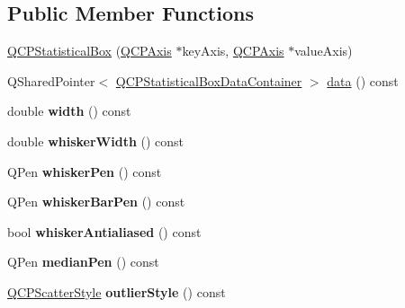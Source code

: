 \subsection*{Public Member Functions}
\begin{DoxyCompactItemize}
\item 
\hyperlink{classQCPStatisticalBox_a75c2b3e7fcd0741cc981693a2ba63b27}{Q\+C\+P\+Statistical\+Box} (\hyperlink{classQCPAxis}{Q\+C\+P\+Axis} $\ast$key\+Axis, \hyperlink{classQCPAxis}{Q\+C\+P\+Axis} $\ast$value\+Axis)
\item 
Q\+Shared\+Pointer$<$ \hyperlink{classQCPDataContainer}{Q\+C\+P\+Statistical\+Box\+Data\+Container} $>$ \hyperlink{classQCPStatisticalBox_a99de828ddad81bb79aaed7db54b87e3f}{data} () const 
\item 
double {\bfseries width} () const \hypertarget{classQCPStatisticalBox_a0733a7bd575fc5929ce6d507bcc2a04c}{}\label{classQCPStatisticalBox_a0733a7bd575fc5929ce6d507bcc2a04c}

\item 
double {\bfseries whisker\+Width} () const \hypertarget{classQCPStatisticalBox_ab02392dd54ebd6dd7c8d6fb5c3f0421c}{}\label{classQCPStatisticalBox_ab02392dd54ebd6dd7c8d6fb5c3f0421c}

\item 
Q\+Pen {\bfseries whisker\+Pen} () const \hypertarget{classQCPStatisticalBox_a26d2b34cbaeac2dd639bb21590f317c4}{}\label{classQCPStatisticalBox_a26d2b34cbaeac2dd639bb21590f317c4}

\item 
Q\+Pen {\bfseries whisker\+Bar\+Pen} () const \hypertarget{classQCPStatisticalBox_ab151a727fb0b6396acb3b6c72505a4fe}{}\label{classQCPStatisticalBox_ab151a727fb0b6396acb3b6c72505a4fe}

\item 
bool {\bfseries whisker\+Antialiased} () const \hypertarget{classQCPStatisticalBox_a1385fb66ed6a1e8edd9128eb7dca73d6}{}\label{classQCPStatisticalBox_a1385fb66ed6a1e8edd9128eb7dca73d6}

\item 
Q\+Pen {\bfseries median\+Pen} () const \hypertarget{classQCPStatisticalBox_a96aa0bb650b83e9dfa0387ca4db7fa05}{}\label{classQCPStatisticalBox_a96aa0bb650b83e9dfa0387ca4db7fa05}

\item 
\hyperlink{classQCPScatterStyle}{Q\+C\+P\+Scatter\+Style} {\bfseries outlier\+Style} () const \hypertarget{classQCPStatisticalBox_ab7e5a68bce97ba43a7ff18e074c4dcad}{}\label{classQCPStatisticalBox_ab7e5a68bce97ba43a7ff18e074c4dcad}


\end{DoxyCompactItemize}
